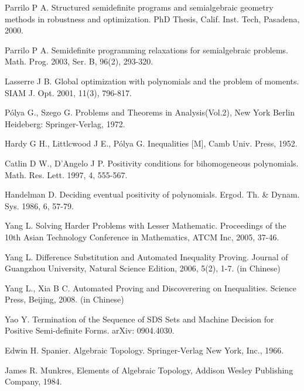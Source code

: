 \documentclass [10pt,a4paper]{article}
\begin{document}
\begin{thebibliography}{99}
Parrilo P A. Structured semidefinite programs and semialgebraic
geometry methods in robustness and optimization. PhD Thesis, Calif.
Inst. Tech, Pasadena,  2000.

Parrilo P A. Semidefinite programming relaxations for semialgebraic
problems. Math. Prog.  2003, Ser. B, 96(2), 293-320.

Lasserre J  B.  Global optimization with polynomials and the problem
of moments. SIAM J. Opt. 2001, 11(3), 796-817.

P\'{o}lya G., Szego G. Problems and Theorems in Analysis(Vol.2),
 New York Berlin Heideberg: Springer-Verlag, 1972.

Hardy G H., Littlcwood J E.,  P\'{o}lya G. Inequalities [M], Camb
Univ.  Press, 1952.

 Catlin D W., D'Angelo J P.  Positivity conditions for
bihomogeneous polynomials.  Math. Res. Lett. 1997, 4, 555-567.

 Handelman D. Deciding eventual positivity of polynomials. Ergod. Th. \& Dynam.  Sys. 1986, 6, 57-79.

Yang L. Solving Harder Problems with Lesser Mathematic. Proceedings
of the 10th Asian Technology Conference in Mathematics, ATCM Inc,
2005, 37-46.

Yang L. Difference Substitution and Automated Inequality Proving.
Journal of Guangzhou University, Natural Science Edition, 2006,
5(2), 1-7. (in Chinese)


Yang L., Xia B C.  Automated Proving and Discoverering on Inequalities. Science
Press, Beijing, 2008. (in Chinese)



Yao Y. Termination of the Sequence of SDS Sets and Machine Decision
for Positive Semi-definite Forms.  arXiv: 0904.4030.






Edwin H. Spanier. Algebraic Topology. Springer-Verlag New York,
Inc., 1966.

 James R. Munkres,   Elements of Algebraic Topology,
Addison Wesley Publishing Company, 1984.



\end{thebibliography}
\end{document}
